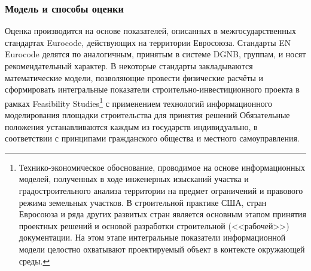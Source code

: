 \subsubsection*{Модель и способы оценки}
Оценка производится на основе показателей, описанных в межгосударственных стандартах Eurocode, действующих на территории Евросоюза.
Стандарты EN Eurocode делятся по аналогичным, принятым в системе DGNB, группам, и носят рекомендательный характер.
В некоторые стандарты закладываются математические модели, позволяющие провести физические расчёты и сформировать интегральные показатели строительно-инвестиционного проекта
в рамках Feasibility Studies\footnote{Технико-экономическое обоснование, проводимое на основе информационных моделей, полученных в ходе инженерных изысканий участка и градостроительного анализа территории на предмет ограничений и правового режима земельных участков.
        В строительной практике США, стран Евросоюза и ряда других развитых стран является основным этапом принятия проектных решений и основой разработки строительной (<<рабочей>>) документации.
        На этом этапе интегральные показатели информационной модели целостно охватывают проектируемый объект в контексте окружающей среды.}
с применением технологий информационного моделирования площадки строительства для принятия решений
Обязательные положения устанавливаются каждым из государств индивидуально, в соответствии с принципами гражданского общества и местного самоуправления.

